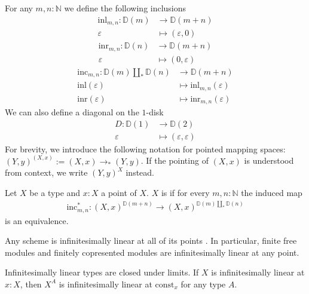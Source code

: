 For any $m,n : \mathbb{N}$ we define the following inclusions
\begin{align*}
  \mathrm{inl}_{m,n} : \mathbb{D}(m) & \rightarrow \mathbb{D}(m + n) \\
  \varepsilon & \mapsto (\varepsilon,0)
\end{align*}
\begin{align*}
  \mathrm{inr}_{m,n} : \mathbb{D}(n) & \rightarrow \mathbb{D}(m + n) \\
  \varepsilon & \mapsto (0,\varepsilon)
\end{align*}
\begin{align*}
  \mathrm{inc}_{m,n} : \mathbb{D}(m) \underset{\ast}{\coprod} \mathbb{D}(n) & \rightarrow \mathbb{D}(m+n) \\
  \mathrm{inl}(\varepsilon) & \mapsto \mathrm{inl}_{m,n}(\varepsilon) \\
  \mathrm{inr}(\varepsilon) & \mapsto \mathrm{inr}_{m,n}(\varepsilon)
\end{align*}
We can also define a diagonal on the $1$-disk
\begin{align*}
  D : \mathbb{D}(1) & \rightarrow \mathbb{D}(2) \\
  \varepsilon & \mapsto (\varepsilon,\varepsilon)
\end{align*}
For brevity, we introduce the following notation for pointed mapping spaces: $(Y,y)^{(X,x)} := (X,x) \rightarrow_\ast (Y,y)$. If the pointing of $(X,x)$ is understood from context, we write $(Y,y)^X$ instead.

\begin{definition}
  Let $X$ be a type and $x : X$ a point of $X$.
  $X$ is  if for every $m, n : \mathbb{N}$ the induced map
  \begin{align*}
    \mathrm{inc}_{m,n}^* : (X,x)^{\mathbb{D}(m+n)} \rightarrow (X,x)^{\mathbb{D}(m) \underset{*}{\coprod} \mathbb{D}(n)}
  \end{align*}
  is an equivalence.
\end{definition}

Any scheme is infinitesimally linear at all of its points \cite{diffgeo-article}.
In particular, finite free modules and finitely copresented modules are infinitesimally linear at any point.

\begin{proposition}
  Infinitesimally linear types are closed under limits.
  If $X$ is infinitesimally linear at $x : X$, then $X^A$ is infinitesimally linear at $\mathrm{const}_x$ for any type $A$.
\end{proposition}

